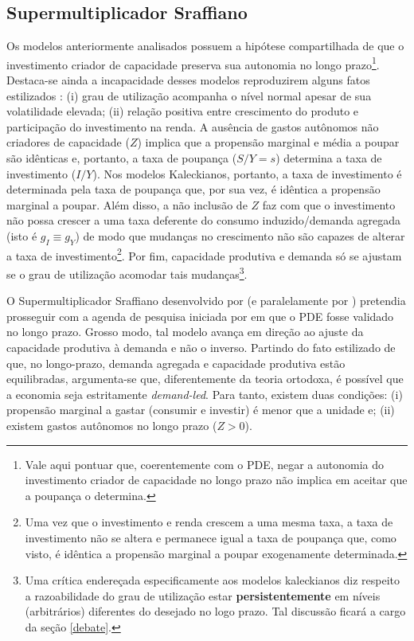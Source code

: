 \subsection{Supermultiplicador Sraffiano}



Os modelos anteriormente analisados possuem a hipótese compartilhada de que o investimento criador de capacidade preserva sua autonomia no longo prazo\footnote{Vale aqui pontuar que, coerentemente com o PDE, negar a autonomia do investimento criador de capacidade no longo prazo não implica em aceitar que a poupança o determina.}.  Destaca-se ainda a incapacidade desses modelos reproduzirem alguns fatos estilizados \cite[p.~5]{fagundes_role_2017}: (i) grau de utilização acompanha o nível normal apesar de sua volatilidade elevada; (ii) relação positiva entre crescimento do produto e participação do investimento na renda. A ausência de gastos autônomos não criadores de capacidade ($Z$) implica que a propensão marginal e média a poupar são idênticas e, portanto, a taxa de poupança ($S/Y = s$) determina a taxa de investimento ($I/Y$). Nos modelos Kaleckianos, portanto, a taxa de investimento é determinada pela taxa de poupança que, por sua vez, é idêntica a propensão marginal a poupar. Além disso, a não inclusão de $Z$ faz com que o investimento não possa crescer a uma taxa deferente do consumo induzido/demanda agregada (isto é $g_I \equiv g_Y$) de modo que mudanças no crescimento não são capazes de alterar a taxa de investimento\footnote{Uma vez que o investimento e renda crescem a uma mesma taxa, a taxa de investimento não se altera e permanece igual a taxa de poupança que, como visto, é idêntica a propensão marginal a poupar exogenamente determinada.}. Por fim, capacidade produtiva e demanda só se ajustam se o grau de utilização acomodar tais mudanças\cite[p.~84--86]{serrano_sraffian_2017}\footnote{Uma crítica endereçada especificamente aos modelos kaleckianos diz respeito a razoabilidade do grau de utilização estar \textbf{persistentemente} em níveis (arbitrários) diferentes do desejado no logo prazo. Tal discussão ficará a cargo da seção \ref{debate}.}.


O Supermultiplicador Sraffiano desenvolvido por \textcite{serrano_sraffian_1995} (e paralelamente por \textcite{bortis_institutions_1996}) pretendia prosseguir com a agenda de pesquisa iniciada por \textcite[Original de 1962]{garegnani_problem_2015} em que o PDE fosse validado no longo prazo.  Grosso modo, tal modelo avança em direção ao ajuste da capacidade produtiva à demanda e não o inverso.
Partindo do fato estilizado de que, no longo-prazo, demanda agregada e capacidade produtiva estão equilibradas, argumenta-se que, diferentemente da teoria ortodoxa, é possível que a economia seja estritamente \textit{demand-led}. Para tanto, existem duas condições: (i) propensão marginal a gastar (consumir e investir) é menor que a unidade e; (ii) existem gastos autônomos no longo prazo ($Z > 0$).

